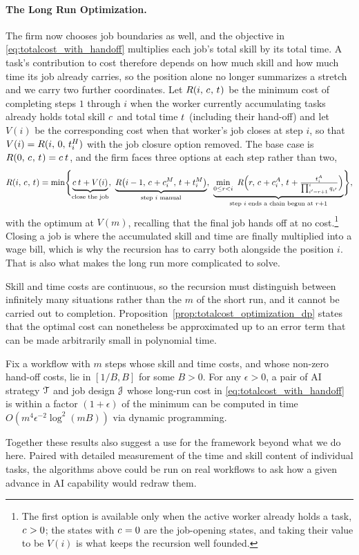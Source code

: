 \paragraph{The Long Run Optimization.}
The firm now chooses job boundaries as well, and the objective in \eqref{eq:totalcost_with_handoff} multiplies each job's total skill by its total time.
A task's contribution to cost therefore depends on how much skill and how much time its job already carries, so the position alone no longer summarizes a stretch and we carry two further coordinates.
Let $R(i,\, c_{},\, t_{})$ be the minimum cost of completing steps $1$ through $i$ when the worker currently accumulating tasks already holds total skill $c_{}$ and total time $t_{}$ (including their hand-off) and let $V(i)$ be the corresponding cost when that worker's job closes at step $i$, so that $V(i) = R(i,\, 0,\, t^{H}_{i})$ with the job closure option removed.
The base case is $R(0,\, c_{},\, t_{}) = c_{}\,t_{}$, and the firm faces three options at each step rather than two,
\begin{align}
\label{eq:longrun_recursion}
R(i,\, \skillcost{},\, \timecost{}) = \min\Biggl\{ \underbrace{\skillcost{}\,\timecost{} + V(i)}_{\text{close the job}}, \ \underbrace{R\bigl(i-1,\, \skillcost{} + \manualSkill{i},\, \timecost{} + \manualTime{i}\bigr)}_{\text{step $i$ manual}}, \ \underbrace{\min_{0 \le r < i}\ R\Bigl(r,\, \skillcost{} + \AIskill{i},\, \timecost{} + \tfrac{\AItime{i}}{\prod_{i'=r+1}^{i} q_{i'}}\Bigr)}_{\text{step $i$ ends a chain begun at } r+1} \Biggr\},
\end{align}
with the optimum at $V(m)$, recalling that the final job hands off at no cost.\footnote{
The first option is available only when the active worker already holds a task, $c_{} > 0$; the states with $c_{} = 0$ are the job-opening states, and taking their value to be $V(i)$ is what keeps the recursion well founded.
}
Closing a job is where the accumulated skill and time are finally multiplied into a wage bill, which is why the recursion has to carry both alongside the position $i$.
That is also what makes the long run more complicated to solve.

Skill and time costs are continuous, so the recursion must distinguish between infinitely many situations rather than the $m$ of the short run, and it cannot be carried out to completion.
Proposition~\ref{prop:totalcost_optimization_dp} states that the optimal cost can nonetheless be approximated up to an error term that can be made arbitrarily small in polynomial time.
\begin{proposition}
\label{prop:totalcost_optimization_dp}
Fix a workflow with $m$ steps whose skill and time costs, and whose non-zero hand-off costs, lie in $[1/B, B]$ for some $B > 0$.
For any $\epsilon > 0$, a pair of AI strategy $\mathcal{T}$ and job design $\mathcal{J}$ whose long-run cost in \eqref{eq:totalcost_with_handoff} is within a factor $(1+\epsilon)$ of the minimum can be computed in time $O(m^4 \epsilon^{-2} \log^2(mB))$ via dynamic programming.
\end{proposition}

Together these results also suggest a use for the framework beyond what we do here.
Paired with detailed measurement of the time and skill content of individual tasks, the algorithms above could be run on real workflows to ask how a given advance in AI capability would redraw them.
